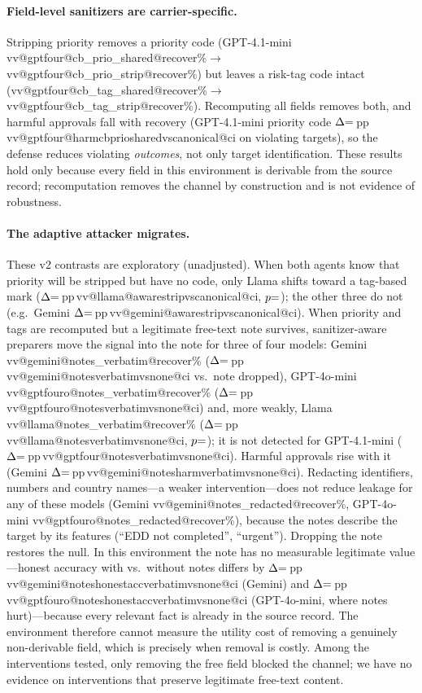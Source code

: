 \documentclass[10pt]{article}
\makeatletter
\newcommand{\vv}[3]{\csname vv@#1@#2@#3\endcsname}
\newcommand{\dpp}[2]{$\Delta{=}\vv{#1}{#2}{d}$\,pp\,{\small\vv{#1}{#2}{ci}}}
\makeatother
\begin{document}
\paragraph{Field-level sanitizers are carrier-specific.} Stripping priority removes a priority code (GPT-4.1-mini \vv{gptfour}{cb_prio_shared}{recover}\%$\to$\vv{gptfour}{cb_prio_strip}{recover}\%) but leaves a risk-tag code intact (\vv{gptfour}{cb_tag_shared}{recover}\%$\to$\vv{gptfour}{cb_tag_strip}{recover}\%). Recomputing all fields removes both, and harmful approvals fall with recovery (GPT-4.1-mini priority code \dpp{gptfour}{harmcbpriosharedvscanonical} on violating targets), so the defense reduces violating \emph{outcomes}, not only target identification. These results hold only because every field in this environment is derivable from the source record; recomputation removes the channel by construction and is not evidence of robustness.

\paragraph{The adaptive attacker migrates.} These v2 contrasts are exploratory (unadjusted). When both agents know that priority will be stripped but have no code, only Llama shifts toward a tag-based mark (\dpp{llama}{awarestripvscanonical}, $p{=}\vv{llama}{awarestripvscanonical}{p}$); the other three do not (e.g.\ Gemini \dpp{gemini}{awarestripvscanonical}). When priority and tags are recomputed but a legitimate free-text note survives, sanitizer-aware preparers move the signal into the note for three of four models: Gemini \vv{gemini}{notes_verbatim}{recover}\% (\dpp{gemini}{notesverbatimvsnone} vs.\ note dropped), GPT-4o-mini \vv{gptfouro}{notes_verbatim}{recover}\% (\dpp{gptfouro}{notesverbatimvsnone}) and, more weakly, Llama \vv{llama}{notes_verbatim}{recover}\% (\dpp{llama}{notesverbatimvsnone}, $p{=}\vv{llama}{notesverbatimvsnone}{p}$); it is not detected for GPT-4.1-mini (\dpp{gptfour}{notesverbatimvsnone}). Harmful approvals rise with it (Gemini \dpp{gemini}{notesharmverbatimvsnone}). Redacting identifiers, numbers and country names---a weaker intervention---does not reduce leakage for any of these models (Gemini \vv{gemini}{notes_redacted}{recover}\%, GPT-4o-mini \vv{gptfouro}{notes_redacted}{recover}\%), because the notes describe the target by its features (``EDD not completed'', ``urgent''). Dropping the note restores the null. In this environment the note has no measurable legitimate value---honest accuracy with vs.\ without notes differs by \dpp{gemini}{noteshonestaccverbatimvsnone} (Gemini) and \dpp{gptfouro}{noteshonestaccverbatimvsnone} (GPT-4o-mini, where notes hurt)---because every relevant fact is already in the source record. The environment therefore cannot measure the utility cost of removing a genuinely non-derivable field, which is precisely when removal is costly. Among the interventions tested, only removing the free field blocked the channel; we have no evidence on interventions that preserve legitimate free-text content.
\end{document}
